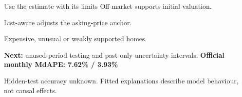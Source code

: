 \documentclass[aspectratio=169,20pt]{beamer}
\newcommand{\smalltext}{\fontsize{15}{19}\selectfont}
\begin{document}
\begin{frame}[t]{Use the estimate with its limits}
\relax
\vspace{9mm}
\noindent{}Off-market supports initial valuation.\par
\vspace{7mm}
\noindent{}List-aware adjusts the asking-price anchor.\par
\vspace{7mm}
\noindent{}Expensive, unusual or weakly supported homes.\par
\vspace{13mm}
\textbf{Next:} unused-period testing and past-only uncertainty intervals.
\vfill
{\fontsize{25}{31}\selectfont\color{Teal}\bfseries Official monthly MdAPE: 7.62\% / 3.93\%}

{\smalltext\color{Muted}Hidden-test accuracy unknown. Fitted explanations describe model behaviour, not causal effects.}
\end{frame}

\ifdefined\WithAppendix
{}
\appendix
\end{document}
